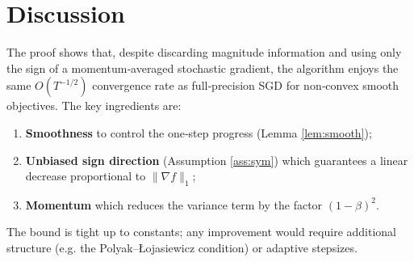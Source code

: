 \documentclass{article}
\begin{document}
\section*{Discussion}
The proof shows that, despite discarding magnitude information and using only
the sign of a momentum‑averaged stochastic gradient, the algorithm enjoys the
same $O(T^{-1/2})$ convergence rate as full‑precision SGD for non‑convex smooth
objectives.  The key ingredients are:

\begin{enumerate}
\item \textbf{Smoothness} to control the one‑step progress (Lemma \ref{lem:smooth});
\item \textbf{Unbiased sign direction} (Assumption \ref{ass:sym}) which guarantees a
      linear decrease proportional to $\|\nabla f\|_{1}$;
\item \textbf{Momentum} which reduces the variance term by the factor $(1-\beta)^{2}$.
\end{enumerate}
The bound is tight up to constants; any improvement would require additional
structure (e.g. the Polyak–Łojasiewicz condition) or adaptive stepsizes.
\end{document}
